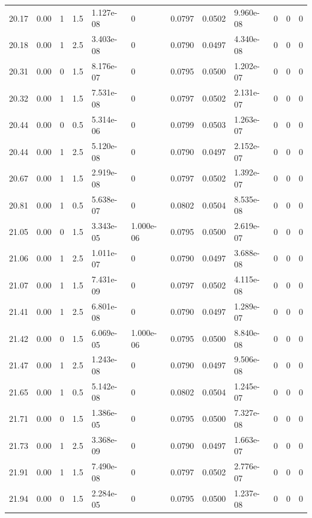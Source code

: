 \documentclass[preview]{standalone}
\begin{document}
{{{{{\begin{tabular}{L{1.2cm}C{1.2cm} C{0.3cm}C{0.5cm} C{1.4cm}C{1.4cm} C{1.4cm}C{1.4cm} C{1.6cm}C{1.6cm} C{1.6cm}C{1.6cm}}
  20.17  &  0.00  & 1     & 1.5 &  1.127e-08  & 0  &  0.0797&   0.0502& 9.960e-08 & 0   &  0 & 0  \\ 
  20.18  &  0.00  & 1     & 2.5 &  3.403e-08  & 0  &  0.0790&   0.0497& 4.340e-08 & 0   &  0 & 0  \\ 
  20.31  &  0.00  & 0     & 1.5 &  8.176e-07  & 0  &  0.0795&   0.0500& 1.202e-07 & 0   &  0 & 0  \\ 
  20.32  &  0.00  & 1     & 1.5 &  7.531e-08  & 0  &  0.0797&   0.0502& 2.131e-07 & 0   &  0 & 0  \\ 
  20.44  &  0.00  & 0     & 0.5 &  5.314e-06  & 0  &  0.0799&   0.0503& 1.263e-07 & 0   &  0 & 0  \\ 
  20.44  &  0.00  & 1     & 2.5 &  5.120e-08  & 0  &  0.0790&   0.0497& 2.152e-07 & 0   &  0 & 0  \\ 
  20.67  &  0.00  & 1     & 1.5 &  2.919e-08  & 0  &  0.0797&   0.0502& 1.392e-07 & 0   &  0 & 0  \\ 
  20.81  &  0.00  & 1     & 0.5 &  5.638e-07  & 0  &  0.0802&   0.0504& 8.535e-08 & 0   &  0 & 0  \\ 
  21.05  &  0.00  & 0     & 1.5 &  3.343e-05  & 1.000e-06  &  0.0795&   0.0500& 2.619e-07 & 0   &  0 & 0  \\ 
  21.06  &  0.00  & 1     & 2.5 &  1.011e-07  & 0  &  0.0790&   0.0497& 3.688e-08 & 0   &  0 & 0  \\ 
  21.07  &  0.00  & 1     & 1.5 &  7.431e-09  & 0  &  0.0797&   0.0502& 4.115e-08 & 0   &  0 & 0  \\ 
  21.41  &  0.00  & 1     & 2.5 &  6.801e-08  & 0  &  0.0790&   0.0497& 1.289e-07 & 0   &  0 & 0  \\ 
  21.42  &  0.00  & 0     & 1.5 &  6.069e-05  & 1.000e-06  &  0.0795&   0.0500& 8.840e-08 & 0   &  0 & 0  \\ 
  21.47  &  0.00  & 1     & 2.5 &  1.243e-08  & 0  &  0.0790&   0.0497& 9.506e-08 & 0   &  0 & 0  \\ 
  21.65  &  0.00  & 1     & 0.5 &  5.142e-08  & 0  &  0.0802&   0.0504& 1.245e-07 & 0   &  0 & 0  \\ 
  21.71  &  0.00  & 0     & 1.5 &  1.386e-05  & 0  &  0.0795&   0.0500& 7.327e-08 & 0   &  0 & 0  \\ 
  21.73  &  0.00  & 1     & 2.5 &  3.368e-09  & 0  &  0.0790&   0.0497& 1.663e-07 & 0   &  0 & 0  \\ 
  21.91  &  0.00  & 1     & 1.5 &  7.490e-08  & 0  &  0.0797&   0.0502& 2.776e-07 & 0   &  0 & 0  \\ 
  21.94  &  0.00  & 0     & 1.5 &  2.284e-05  & 0  &  0.0795&   0.0500& 1.237e-08 & 0   &  0 & 0  \\ 

\end{tabular}}}}}}
\end{document}

